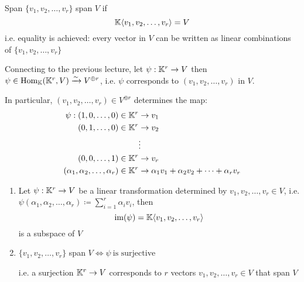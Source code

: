 

\begin{definition} {Span}
    \(\{v_1, v_2, \dots, v_r\}\) span \(V\) if \[
        \mathbb{K}\langle v_1, v_2, \dots, v_r \rangle = V
    \]
    i.e. equality is achieved: every vector in \(V\) can be written as linear combinations of \(\{v_1, v_2, \dots, v_r\}\)
\end{definition}

Connecting to the previous lecture, let \(\psi: \mathbb{K}^r \to V\) then \(\psi \in \mathrm{Hom}_{\mathbb{K}}(\mathbb{K}^r, V) \xrightarrow{\sim} V^{\oplus r}\), i.e. \(\psi\) corresponds to \((v_1, v_2, \dots, v_r)\) in \(V\).

In particular, \((v_1, v_2, \dots, v_r) \in V^{\oplus r}\) determines the map:
\begin{align*}
    \psi: (1, 0, \dots, 0) \in \mathbb{K}^r                & \to v_1                                             \\
    (0, 1, \dots, 0) \in \mathbb{K}^r                      & \to v_2                                             \\
                                                     & \vdots                                              \\
    (0, 0, \dots, 1) \in \mathbb{K}^r                      & \to v_r                                             \\
    (\alpha_1, \alpha_2, \dots, \alpha_r) \in \mathbb{K}^r & \to \alpha_1v_1 + \alpha_2v_2 + \dots + \alpha_rv_r
\end{align*}

\begin{lemma}
    \hfill
    \begin{enumerate}
        \item Let \(\psi: \mathbb{K}^r \to V\) be a linear transformation determined by \(v_1, v_2, \dots, v_r \in V\), i.e. \(\psi(\alpha_1, \alpha_2, \dots, \alpha_r) \coloneqq \sum_{i=1}^r \alpha_iv_i\), then \[
                  \mathrm{im}(\psi) = \mathbb{K}\langle v_1, v_2, \dots, v_r \rangle
              \] is a subspace of \(V\)
        \item \(\{v_1, v_2, \dots, v_r\}\) span \(V \Leftrightarrow \psi \:\text{is surjective}\: \)

              i.e. a surjection \(\mathbb{K}^r \to V\) corresponds to \(r\) vectors \(v_1, v_2, \dots, v_r \in V\) that span \(V\)
    \end{enumerate}
\end{lemma}

